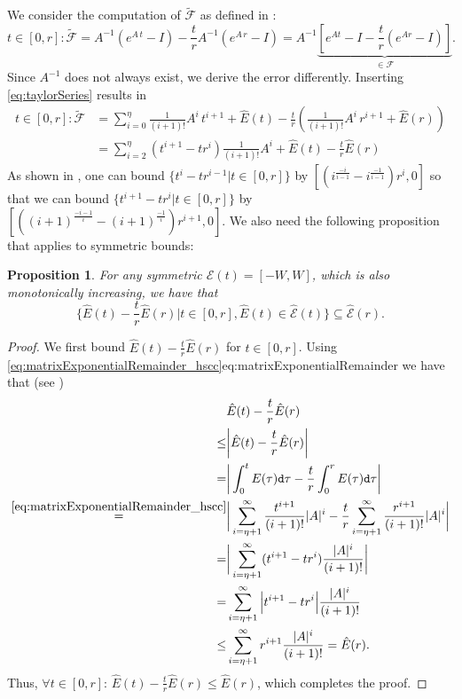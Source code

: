 \documentclass{amsproc}
\newtheorem{proposition}{Proposition}[section]
\renewcommand{\^}[1]{^{(#1)}}
\begin{document}
We consider the computation of $\tilde{\mathcal{F}}$ as defined in \cite[eq.~(3.9)]{Althoff2010a}:
\begin{equation*}
  t\in[0,r] : \tilde{\mathcal{F}} = A^{-1}(e^{A \, t}-I) - \frac{t}{r}A^{-1}(e^{A \, r} - I) = A^{-1}\underbrace{\left[e^{At}-I - \frac{t}{r}(e^{Ar}-I)\right]}_{\in\mathcal{F}}.
\end{equation*}
Since $A^{-1}$ does not always exist, we derive the error differently. Inserting \eqref{eq:taylorSeries} results in 
\begin{equation*}
\begin{split}
  t\in[0,r] : \tilde{\mathcal{F}} &= \sum_{i=0}^{\eta} \frac{1}{(i+1)!}A^i \, t^{i+1} + \hat{E}(t) - \frac{t}{r}(\frac{1}{(i+1)!}A^i \, r^{i+1} + \hat{E}(r)) \\
  &= \sum_{i=2}^{\eta} (t^{i+1} - tr^{i} )\frac{1}{(i+1)!}A^i  + \hat{E}(t) - \frac{t}{r}\hat{E}(r) 
\end{split}
\end{equation*}
As shown in \cite[Prop.~3.1]{Althoff2010a}, one can bound $\{t^{i} - tr^{i-1}|t\in[0,r]\}$ by $[(i^{\frac{-i}{i-1}}-i^{\frac{-1}{i-1}})r^i,0]$ so that we can bound $\{t^{i+1} - tr^{i}|t\in[0,r]\}$ by $[((i+1)^{\frac{-i-1}{i}}-(i+1)^{\frac{-1}{i}})r^{i+1},0]$. We also need the following proposition that applies to symmetric bounds:
\begin{proposition}
 For any symmetric $\mathcal{E}(t)=[-W,W]$, which is also monotonically increasing, we have that
 \begin{equation*}
  \Big\{\hat{E}(t) - \frac{t}{r}\hat{E}(r) \Big| t\in[0,r], \hat{E}(t) \in \hat{\mathcal{E}}(t) \Big\} \subseteq \hat{\mathcal{E}}(r).
 \end{equation*}
\end{proposition}
\begin{proof}
We first bound $\hat{E}(t) - \frac{t}{r} \hat{E}(r)$ for $t\in[0,r]$. Using \eqref{eq:matrixExponentialRemainder_hscc}{eq:matrixExponentialRemainder} we have that (see \cite[Lemma III.3]{Althoff2020c})
\begin{equation*}
 \begin{split}
  & \hat{E}(t) - \frac{t}{r} \hat{E}(r) \\
  \leq & \bigg|\hat{E}(t) - \frac{t}{r} \hat{E}(r)\bigg| \\
  = & \bigg|\int_0^t E(\tau) \mathtt{d}\tau - \frac{t}{r} \int_0^r E(\tau) \mathtt{d}\tau \bigg| \\
  \overset{\eqref{eq:matrixExponentialRemainder_hscc}}{=} & \bigg|\sum_{i=\eta+1}^{\infty} \frac{t^{i+1}}{(i+1)!}|A|^i - \frac{t}{r}\sum_{i=\eta+1}^{\infty} \frac{r^{i+1}}{(i+1)!}|A|^i\bigg| \\
  = & \bigg|\sum_{i=\eta+1}^{\infty} (t^{i+1} - tr^{i})\frac{|A|^i}{(i+1)!} \bigg| \\
  = & \sum_{i=\eta+1}^{\infty} \Big|t^{i+1} - tr^{i}\Big|\frac{|A|^i}{(i+1)!}  \\
  \leq & \sum_{i=\eta+1}^{\infty} r^{i+1} \frac{|A|^i}{(i+1)!} = \hat{E}(r).
 \end{split}
\end{equation*}
Thus, $\forall t\in[0,r]: \, \hat{E}(t) - \frac{t}{r} \hat{E}(r) \leq \hat{E}(r)$, which completes the proof.
\end{proof}



\end{document}
